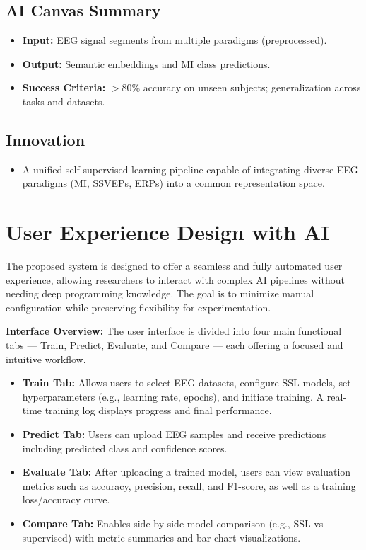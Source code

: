 \subsection{AI Canvas Summary}
\label{subsec:ai-canvas-summary}
\begin{itemize}[leftmargin=3.5em]
    \item \textbf{Input:} EEG signal segments from multiple paradigms (preprocessed).
    \item \textbf{Output:} Semantic embeddings and MI class predictions.
    \item \textbf{Success Criteria:} $>$80\% accuracy on unseen subjects; generalization across tasks and datasets.
\end{itemize}

\subsection{Innovation}
\label{subsec:innovation}
\begin{itemize}[leftmargin=3.5em]
    \item A unified self-supervised learning pipeline capable of integrating diverse EEG paradigms (MI, SSVEPs, ERPs) into a common representation space.
\end{itemize}

\pagebreak
\section{User Experience Design with AI}
\label{sec:ux-ai}

The proposed system is designed to offer a seamless and fully automated user experience, allowing researchers to interact with complex AI pipelines without needing deep programming knowledge.
The goal is to minimize manual configuration while preserving flexibility for experimentation.

\vspace{1em}
\noindent\textbf{Interface Overview:}
The user interface is divided into four main functional tabs — Train, Predict, Evaluate, and Compare — each offering a focused and intuitive workflow.

\begin{itemize}[leftmargin=3.5em]
    \item \textbf{Train Tab:} Allows users to select EEG datasets, configure SSL models, set hyperparameters (e.g., learning rate, epochs), and initiate training.
    A real-time training log displays progress and final performance.
    \item \textbf{Predict Tab:} Users can upload EEG samples and receive predictions including predicted class and confidence scores.
    \item \textbf{Evaluate Tab:} After uploading a trained model, users can view evaluation metrics such as accuracy, precision, recall, and F1-score, as well as a training loss/accuracy curve.
    \item \textbf{Compare Tab:} Enables side-by-side model comparison (e.g., SSL vs supervised) with metric summaries and bar chart visualizations.
\end{itemize}

